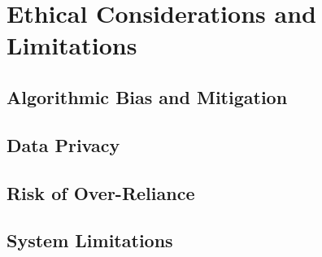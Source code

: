 
\section{Ethical Considerations and Limitations}

\subsection{Algorithmic Bias and Mitigation}

\subsection{Data Privacy}

\subsection{Risk of Over-Reliance}

\subsection{System Limitations}
